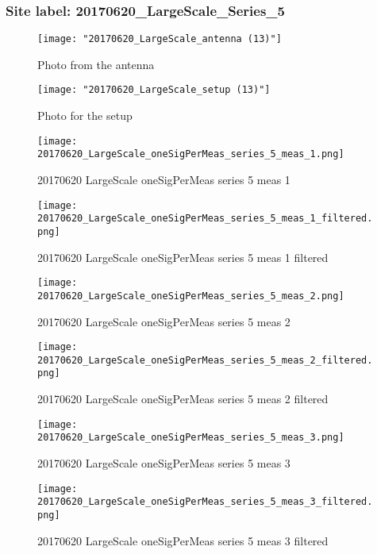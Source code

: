 \subsubsection{Site label: 20170620\_LargeScale\_Series\_5}
\begin{figure}[ht] \caption{Photo from the antenna}
\texttt{[image: "20170620\_LargeScale\_antenna (13)"]}\centering\end{figure}
\begin{figure}[ht] \caption{Photo for the setup}
\texttt{[image: "20170620\_LargeScale\_setup (13)"]}\centering\end{figure}
\begin{figure}[ht] \caption{20170620 LargeScale oneSigPerMeas series 5 meas 1}
\texttt{[image: 20170620\_LargeScale\_oneSigPerMeas\_series\_5\_meas\_1.png]}\centering\end{figure}
\begin{figure}[ht] \caption{20170620 LargeScale oneSigPerMeas series 5 meas 1 filtered}
\texttt{[image: 20170620\_LargeScale\_oneSigPerMeas\_series\_5\_meas\_1\_filtered.png]}\centering\end{figure}
\begin{figure}[ht] \caption{20170620 LargeScale oneSigPerMeas series 5 meas 2}
\texttt{[image: 20170620\_LargeScale\_oneSigPerMeas\_series\_5\_meas\_2.png]}\centering\end{figure}
\begin{figure}[ht] \caption{20170620 LargeScale oneSigPerMeas series 5 meas 2 filtered}
\texttt{[image: 20170620\_LargeScale\_oneSigPerMeas\_series\_5\_meas\_2\_filtered.png]}\centering\end{figure}
\begin{figure}[ht] \caption{20170620 LargeScale oneSigPerMeas series 5 meas 3}
\texttt{[image: 20170620\_LargeScale\_oneSigPerMeas\_series\_5\_meas\_3.png]}\centering\end{figure}
\begin{figure}[ht] \caption{20170620 LargeScale oneSigPerMeas series 5 meas 3 filtered}
\texttt{[image: 20170620\_LargeScale\_oneSigPerMeas\_series\_5\_meas\_3\_filtered.png]}\centering\end{figure}
\clearpage
